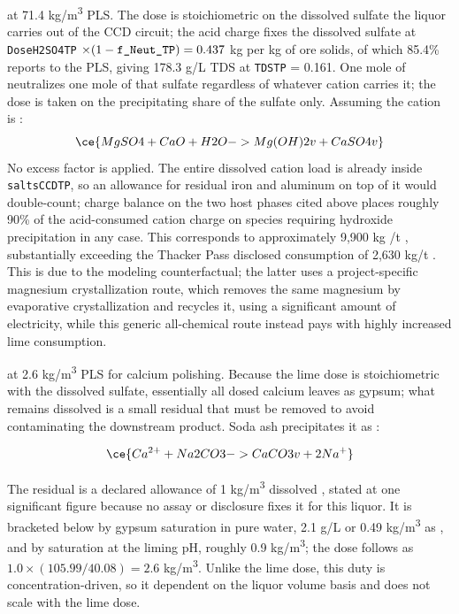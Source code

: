 \documentclass{article}
\renewcommand\_{\textunderscore\allowbreak}
\newcommand{\alteq}[1]{}
\newcommand{\alteqend}{}
\begin{document}
\begin{description}[noitemsep, topsep=0pt]

\item[\textbullet\enskip Lime (\ce{CaO})] at 71.4 \si{kg/m^3} PLS. The dose is stoichiometric on the dissolved sulfate the liquor carries out of the CCD circuit; the acid charge fixes the dissolved sulfate at \texttt{Dose\_H2SO4\_TP} $\times (1 - \texttt{f\_Neut\_TP}) = 0.437$ kg  per kg of ore solids, of which 85.4\% reports to the PLS, giving 178.3 \si{g/L} TDS at \texttt{TDS\_TP} = 0.161. One mole of  neutralizes one mole of that sulfate regardless of whatever cation carries it; the dose is taken on the precipitating share of the sulfate only. Assuming the cation is :
%
\begin{equation*}
  \ce{MgSO4 + CaO + H2O -> Mg(OH)2 v + CaSO4 v}
\end{equation*}
%
No excess factor is applied. The entire dissolved cation load is already inside \texttt{salts\_CCD\_TP}, so an allowance for residual iron and aluminum on top of it would double-count; charge balance on the two host phases cited above places roughly 90\% of the acid-consumed cation charge on species requiring hydroxide precipitation in any case. This corresponds to approximately 9,900 kg /t , substantially exceeding the Thacker Pass disclosed consumption of 2,630 kg/t \cite{sgscanadaincSK1300Technical2024}. This is due to the modeling counterfactual; the latter uses a project-specific magnesium crystallization route, which removes the same magnesium by evaporative crystallization and recycles it, using a significant amount of electricity, while this generic all-chemical route instead pays with highly increased lime consumption. 

\item[\textbullet\enskip Soda ash (\ce{Na2CO3})] at 2.6 \si{kg/m^3} PLS for calcium polishing. Because the lime dose is stoichiometric with the dissolved sulfate, essentially all dosed calcium leaves as gypsum; what remains dissolved is a small residual that must be removed to avoid contaminating the downstream  product. Soda ash precipitates it as :
\alteq{Aqueous calcium ion reacts with sodium carbonate to produce calcium carbonate precipitate and two sodium ions.}
\begin{equation*}
  \ce{Ca^{2+} + Na2CO3 -> CaCO3 v + 2Na^+}
\end{equation*}
\alteqend
The residual is a declared allowance of 1 \si{kg/m^3} dissolved , stated at one significant figure because no assay or disclosure fixes it for this liquor. It is bracketed below by gypsum saturation in pure water, 2.1 \si{g/L}  or 0.49 \si{kg/m^3} as , and by  saturation at the liming pH, roughly 0.9 \si{kg/m^3}; the dose follows as $1.0 \times (105.99/40.08) = 2.6$ \si{kg/m^3}. Unlike the lime dose, this duty is concentration-driven, so it dependent on the liquor volume basis and does not scale with the lime dose.


\end{description}
\end{document}
